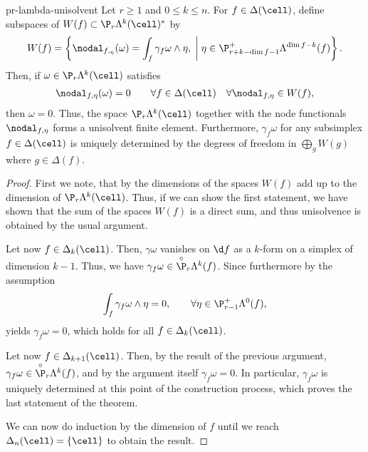 \begin{Theorem}{pr-lambda-unisolvent}
  Let $r\ge 1$ and $0\le k \le n$. For $f\in \Delta(\cell)$, define
  subspaces of $W(f) \subset \P_r\Lambda^k(\cell)^*$ by
  \begin{gather}
    W(f) = \left\{
      \nodal_{f,_\eta}(\omega) = \int_f \gamma_f \omega\wedge\eta,
      \;\middle\vert\;
       \eta \in \P_{r+k-\dim f-1}^+\Lambda^{\dim f-k}(f)
      \right\}.
  \end{gather}
  Then, if $\omega \in \P_r\Lambda^k(\cell)$ satisfies
  \begin{gather}
    \nodal_{f,\eta}(\omega) = 0
    \qquad \forall f\in \Delta(\cell)
    \quad\forall \nodal_{f,\eta} \in W(f),
  \end{gather}
  then $\omega = 0$. Thus, the space $\P_r\Lambda^k(\cell)$ together
  with the node functionals $\nodal_{f,\eta}$ forms a unisolvent
  finite element.  Furthermore, $\gamma_f\omega$ for any subsimplex
  $f\in\Delta(\cell)$ is uniquely determined by the degrees of freedom
  in $\bigoplus_g W(g)$ where $g\in\Delta(f)$.
\end{Theorem}

\begin{proof}
  First we note, that by
   the dimensions
  of the spaces $W(f)$ add up to the dimension of
  $\P_r\Lambda^k(\cell)$. Thus, if we can show the first statement, we
  have shown that the sum of the spaces $W(f)$ is a direct sum, and
  thus unisolvence is obtained by the usual argument.

  Let now $f\in\Delta_k(\cell)$. Then, $\gamma\omega$ vanishes on
  $\d f$ as a $k$-form on a simplex of dimension $k-1$. Thus, we have
  $\gamma_f\omega\in \overset{\circ}{\P}_r\Lambda^k(f)$. Since
  furthermore by the assumption
  \begin{gather}
    \int_f \gamma_f\omega\wedge \eta = 0,
    \qquad \forall \eta \in \P_{r-1}^+\Lambda^0(f),
  \end{gather}
   yields $\gamma_f\omega = 0$, which holds
  for all $f\in\Delta_k(\cell)$.

  Let now $f\in \Delta_{k+1}(\cell)$. Then, by the result of the
  previous argument,
  $\gamma_f\omega\in \overset{\circ}{\P}_r\Lambda^k(f)$, and by the
  argument itself $\gamma_f \omega = 0$. In particular,
  $\gamma_f\omega$ is uniquely determined at this point of the
  construction process, which proves the last statement of the theorem.

  We can now do induction by the dimension of $f$ until we reach
  $\Delta_n(\cell) = \{\cell\}$ to obtain the result.
\end{proof}

